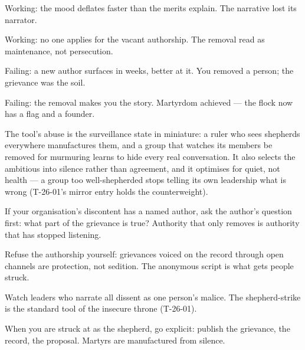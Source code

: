\begin{feedback}
  \item Working: the mood deflates faster than the merits explain. The narrative lost its narrator.
  \item Working: no one applies for the vacant authorship. The removal read as maintenance, not persecution.
  \item Failing: a new author surfaces in weeks, better at it. You removed a person; the grievance was the soil.
  \item Failing: the removal makes you the story. Martyrdom achieved --- the flock now has a flag and a founder.
\end{feedback}
\begin{failure}
The tool's abuse is the surveillance state in miniature: a ruler who sees shepherds everywhere manufactures them, and a group that watches its members be removed for murmuring learns to hide every real conversation. It also selects the ambitious into silence rather than agreement, and it optimises for quiet, not health --- a group too well-shepherded stops telling its own leadership what is wrong (T-26-01's mirror entry holds the counterweight).
\end{failure}
\begin{countermeasures}
  \item If your organisation's discontent has a named author, ask the author's question first: what part of the grievance is true? Authority that only removes is authority that has stopped listening.
  \item Refuse the authorship yourself: grievances voiced on the record through open channels are protection, not sedition. The anonymous script is what gets people struck.
  \item Watch leaders who narrate all dissent as one person's malice. The shepherd-strike is the standard tool of the insecure throne (T-26-01).
  \item When you are struck at as the shepherd, go explicit: publish the grievance, the record, the proposal. Martyrs are manufactured from silence.
\end{countermeasures}

\seesources
{}

